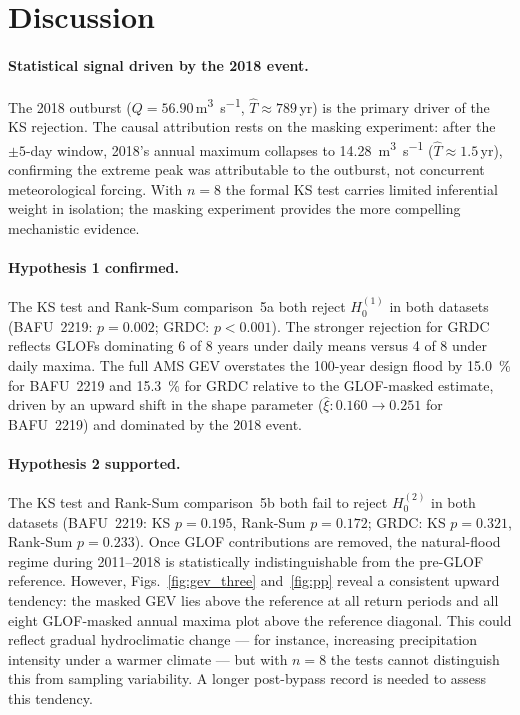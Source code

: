 \section{Discussion}
\label{sec:discussion}

\paragraph{Statistical signal driven by the 2018 event.}
The 2018 outburst ($Q = 56.90$\,\si{m^3\per s}, $\hat{T} \approx 789$\,yr) is the
primary driver of the KS rejection. The causal attribution rests on the masking
experiment: after the $\pm 5$-day window, 2018's annual maximum collapses to
\SI{14.28}{m^3\per s} ($\hat{T} \approx 1.5$\,yr), confirming the extreme peak was
attributable to the outburst, not concurrent meteorological forcing. With $n = 8$ the
formal KS test carries limited inferential weight in isolation; the masking experiment
provides the more compelling mechanistic evidence.

\paragraph{Hypothesis 1 confirmed.}
The KS test and Rank-Sum comparison~5a both reject $H_0^{(1)}$ in both datasets
(BAFU~2219: $p = 0.002$; GRDC: $p < 0.001$). The stronger rejection for GRDC reflects
GLOFs dominating 6 of 8 years under daily means versus 4 of 8 under daily maxima. The
full AMS GEV overstates the 100-year design flood by \SI{15.0}{\percent} for BAFU~2219
and \SI{15.3}{\percent} for GRDC relative to the GLOF-masked estimate, driven by an
upward shift in the shape parameter ($\hat{\xi}: 0.160 \to 0.251$ for BAFU~2219) and
dominated by the 2018 event.

\paragraph{Hypothesis 2 supported.}
The KS test and Rank-Sum comparison~5b both fail to reject $H_0^{(2)}$ in both datasets
(BAFU~2219: KS $p = 0.195$, Rank-Sum $p = 0.172$; GRDC: KS $p = 0.321$, Rank-Sum
$p = 0.233$). Once GLOF contributions are removed, the natural-flood regime during
2011--2018 is statistically indistinguishable from the pre-GLOF reference. However,
Figs.~\ref{fig:gev_three} and~\ref{fig:pp} reveal a consistent upward tendency: the
masked GEV lies above the reference at all return periods and all eight GLOF-masked
annual maxima plot above the reference diagonal. This could reflect gradual hydroclimatic
change --- for instance, increasing precipitation intensity under a warmer climate ---
but with $n = 8$ the tests cannot distinguish this from sampling variability. A longer
post-bypass record is needed to assess this tendency.


